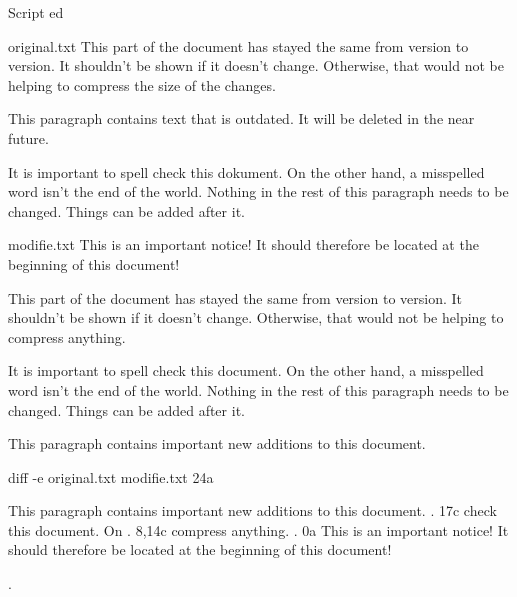 \begin{frame}[fragile]{Script ed}
\begin{tcbraster}[raster columns=3, raster valign=top]
  \begin{snvlisting}{original.txt}
This part of the
document has stayed the
same from version to
version.  It shouldn't
be shown if it doesn't
change.  Otherwise, that
would not be helping to
compress the size of the
changes.

This paragraph contains
text that is outdated.
It will be deleted in the
near future.

It is important to spell
check this dokument. On
the other hand, a
misspelled word isn't
the end of the world.
Nothing in the rest of
this paragraph needs to
be changed. Things can
be added after it.
  \end{snvlisting}
  \begin{snvlisting}{modifie.txt}
This is an important
notice! It should
therefore be located at
the beginning of this
document!

This part of the
document has stayed the
same from version to
version.  It shouldn't
be shown if it doesn't
change.  Otherwise, that
would not be helping to
compress anything.

It is important to spell
check this document. On
the other hand, a
misspelled word isn't
the end of the world.
Nothing in the rest of
this paragraph needs to
be changed. Things can
be added after it.

This paragraph contains
important new additions
to this document.
\end{snvlisting}
\begin{snvlisting}{diff -e original.txt modifie.txt}
24a

This paragraph contains
important new additions
to this document.
.
17c
check this document. On
.
8,14c
compress anything.
.
0a
This is an important
notice! It should
therefore be located at
the beginning of this
document!

.
\end{snvlisting}
\end{tcbraster}
\end{frame}

